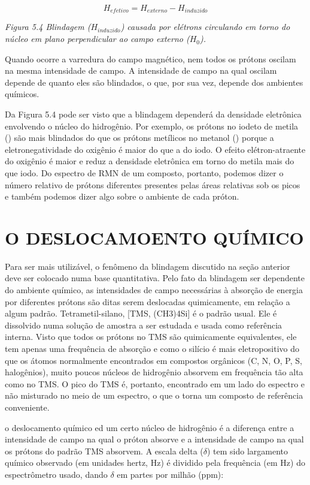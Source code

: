 \begin{equation}
H_{efetivo} = H_{externo}-H_{induzido}
\end{equation}

\emph{Figura 5.4 Blindagem ($H_{induzido}$) causada por elétrons circulando em torno do núcleo em plano perpendicular ao campo externo ($H_0$).}

Quando ocorre a varredura do campo magnético, nem todos os prótons oscilam na mesma intensidade de campo. A intensidade de campo na qual oscilam depende de quanto eles são blindados, o que, por sua vez, depende dos ambientes químicos.

Da Figura 5.4 pode ser visto que a blindagem dependerá da densidade eletrônica envolvendo o núcleo do hidrogênio. Por exemplo, os prótons no iodeto de metila () são mais blindados do que os prótons metílicos no metanol () porque a eletronegatividade do oxigênio é maior do que a do iodo. O efeito elétron-atraente do oxigênio é maior e reduz a densidade eletrônica em torno do metila mais do que iodo. Do espectro de RMN de um composto, portanto, podemos dizer o número relativo de prótons diferentes presentes pelas áreas relativas sob os picos e também podemos dizer algo sobre o ambiente de cada próton.

\section{O DESLOCAMOENTO QUÍMICO}

Para ser mais utilizável, o fenômeno da blindagem discutido na seção anterior deve ser colocado numa base quantitativa. Pelo fato da blindagem ser dependente do ambiente químico, as intensidades de campo necessárias à absorção de energia por diferentes prótons são ditas serem deslocadas quimicamente, em relação a algum padrão. Tetrametil-silano, [TMS, (CH3)4Si] é o padrão usual. Ele é dissolvido numa solução de amostra a ser estudada e usada como referência interna. Visto que todos os prótons no TMS são quimicamente equivalentes, ele tem apenas uma frequência de absorção e como o silício é mais eletropositivo do que os átomos normalmente encontrados em compostos orgânicos (C, N, O, P, S, halogênios), muito poucos núcleos de hidrogênio absorvem em frequência tão alta como no TMS. O pico do TMS é, portanto, encontrado em um lado do espectro e não misturado no meio de um espectro, o que o torna um composto de referência conveniente. 

o deslocamento químico ed um certo núcleo de hidrogênio é a diferença entre a intensidade de campo na qual o próton absorve e a intensidade de campo na qual os prótons do padrão TMS absorvem. A escala delta ($\delta$) tem sido largamento químico observado (em unidades hertz, Hz) é dividido pela frequência (em Hz) do espectrômetro usado, dando $\delta$ em partes por milhão (ppm):

